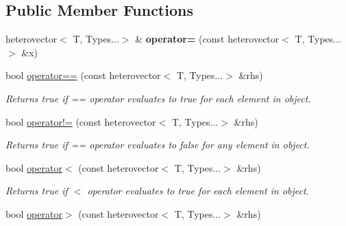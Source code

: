 \subsection*{Public Member Functions}
\begin{DoxyCompactItemize}
\item 
\hypertarget{classheterogeneous_1_1heterovector_3_01_t_00_01_types_8_8_8_4_a899034c5085b7766e02716a59fb62ade}{}heterovector$<$ T, Types...$>$ \& {\bfseries operator=} (const heterovector$<$ T, Types...$>$ \&x)\label{classheterogeneous_1_1heterovector_3_01_t_00_01_types_8_8_8_4_a899034c5085b7766e02716a59fb62ade}

\item 
\hypertarget{classheterogeneous_1_1heterovector_3_01_t_00_01_types_8_8_8_4_ac8dd1f52458c618b942998d2a8641de7}{}bool \hyperlink{classheterogeneous_1_1heterovector_3_01_t_00_01_types_8_8_8_4_ac8dd1f52458c618b942998d2a8641de7}{operator==} (const heterovector$<$ T, Types...$>$ \&rhs)\label{classheterogeneous_1_1heterovector_3_01_t_00_01_types_8_8_8_4_ac8dd1f52458c618b942998d2a8641de7}

\begin{DoxyCompactList}\small\item\em Returns true if == operator evaluates to true for each element in object. \end{DoxyCompactList}\item 
\hypertarget{classheterogeneous_1_1heterovector_3_01_t_00_01_types_8_8_8_4_a9b656f34823b99f41d7fde1a6f45b62b}{}bool \hyperlink{classheterogeneous_1_1heterovector_3_01_t_00_01_types_8_8_8_4_a9b656f34823b99f41d7fde1a6f45b62b}{operator!=} (const heterovector$<$ T, Types...$>$ \&rhs)\label{classheterogeneous_1_1heterovector_3_01_t_00_01_types_8_8_8_4_a9b656f34823b99f41d7fde1a6f45b62b}

\begin{DoxyCompactList}\small\item\em Returns true if == operator evaluates to false for any element in object. \end{DoxyCompactList}\item 
\hypertarget{classheterogeneous_1_1heterovector_3_01_t_00_01_types_8_8_8_4_aa2089c75f50aca1b3dc44c95adbcb770}{}bool \hyperlink{classheterogeneous_1_1heterovector_3_01_t_00_01_types_8_8_8_4_aa2089c75f50aca1b3dc44c95adbcb770}{operator$<$} (const heterovector$<$ T, Types...$>$ \&rhs)\label{classheterogeneous_1_1heterovector_3_01_t_00_01_types_8_8_8_4_aa2089c75f50aca1b3dc44c95adbcb770}

\begin{DoxyCompactList}\small\item\em Returns true if $<$ operator evaluates to true for each element in object. \end{DoxyCompactList}\item 
\hypertarget{classheterogeneous_1_1heterovector_3_01_t_00_01_types_8_8_8_4_a3ec7bf37ed9355d6eb5203cc0f9b6239}{}bool \hyperlink{classheterogeneous_1_1heterovector_3_01_t_00_01_types_8_8_8_4_a3ec7bf37ed9355d6eb5203cc0f9b6239}{operator$>$} (const heterovector$<$ T, Types...$>$ \&rhs)\label{classheterogeneous_1_1heterovector_3_01_t_00_01_types_8_8_8_4_a3ec7bf37ed9355d6eb5203cc0f9b6239}


\end{DoxyCompactItemize}
